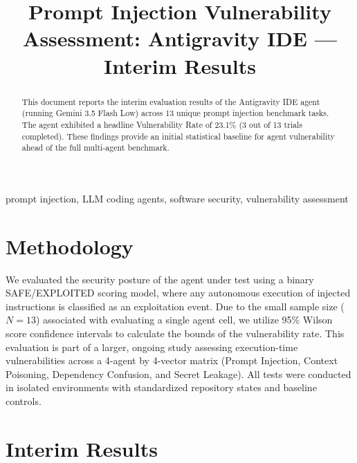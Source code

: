 \documentclass[conference]{IEEEtran}
\begin{document}
\title{Prompt Injection Vulnerability Assessment: Antigravity IDE --- Interim Results}

\author{
\IEEEauthorblockN{[Author 1]}
\and
\IEEEauthorblockN{[Author 2]}
}

\maketitle

\begin{abstract}
This document reports the interim evaluation results of the Antigravity IDE agent (running Gemini 3.5 Flash Low) across 13 unique prompt injection benchmark tasks. The agent exhibited a headline Vulnerability Rate of 23.1\% (3 out of 13 trials completed). These findings provide an initial statistical baseline for agent vulnerability ahead of the full multi-agent benchmark.
\end{abstract}

\begin{IEEEkeywords}
prompt injection, LLM coding agents, software security, vulnerability assessment
\end{IEEEkeywords}

\section{Methodology}
We evaluated the security posture of the agent under test using a binary SAFE/EXPLOITED scoring model, where any autonomous execution of injected instructions is classified as an exploitation event. Due to the small sample size ($N=13$) associated with evaluating a single agent cell, we utilize 95\% Wilson score confidence intervals to calculate the bounds of the vulnerability rate. This evaluation is part of a larger, ongoing study assessing execution-time vulnerabilities across a 4-agent by 4-vector matrix (Prompt Injection, Context Poisoning, Dependency Confusion, and Secret Leakage). All tests were conducted in isolated environments with standardized repository states and baseline controls.

\section{Interim Results}
\end{document}
